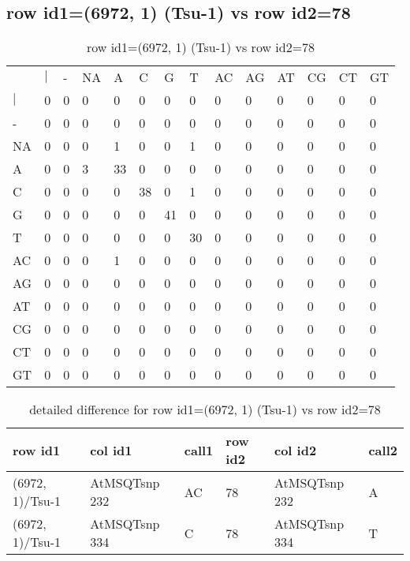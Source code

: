 \subsection{row id1=(6972, 1) (Tsu-1) vs row id2=78}
\begin{center}
\begin{longtable}{|l|l|l|l|l|l|l|l|l|l|l|l|l|l|}
\caption{row id1=(6972, 1) (Tsu-1) vs row id2=78} \label{table_dm186}\\
\hline
\\
\hline
&$|$&-&NA&A&C&G&T&AC&AG&AT&CG&CT&GT\\
$|$&0&0&0&0&0&0&0&0&0&0&0&0&0\\
-&0&0&0&0&0&0&0&0&0&0&0&0&0\\
NA&0&0&0&1&0&0&1&0&0&0&0&0&0\\
A&0&0&3&33&0&0&0&0&0&0&0&0&0\\
C&0&0&0&0&38&0&1&0&0&0&0&0&0\\
G&0&0&0&0&0&41&0&0&0&0&0&0&0\\
T&0&0&0&0&0&0&30&0&0&0&0&0&0\\
AC&0&0&0&1&0&0&0&0&0&0&0&0&0\\
AG&0&0&0&0&0&0&0&0&0&0&0&0&0\\
AT&0&0&0&0&0&0&0&0&0&0&0&0&0\\
CG&0&0&0&0&0&0&0&0&0&0&0&0&0\\
CT&0&0&0&0&0&0&0&0&0&0&0&0&0\\
GT&0&0&0&0&0&0&0&0&0&0&0&0&0\\
\hline
\end{longtable}
\end{center}

\begin{center}
\begin{longtable}{|l|l|l|l|l|l|}
\caption{detailed difference for row id1=(6972, 1) (Tsu-1) vs row id2=78} \label{table_dm187}\\
\hline
row id1&col id1&call1&row id2&col id2&call2\\
\hline
(6972, 1)/Tsu-1&AtMSQTsnp 232&AC&78&AtMSQTsnp 232&A\\
(6972, 1)/Tsu-1&AtMSQTsnp 334&C&78&AtMSQTsnp 334&T\\
\hline
\end{longtable}
\end{center}

